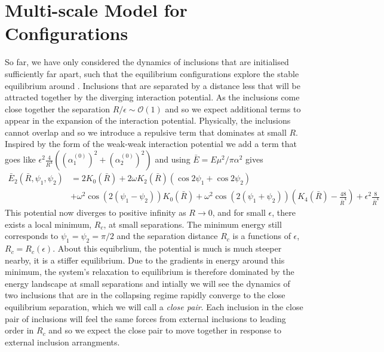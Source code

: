 \section{Multi-scale Model for Configurations}
So far, we have only considered the dynamics of inclusions that are initialised sufficiently far apart, such that the equilibrium configurations explore the stable equilibrium around . Inclusions that are separated by a distance less that  will be attracted together by the diverging interaction potential. As the inclusions come close together the separation $R/\epsilon\sim\mathcal{O}(1)$ and so we expect additional terms to appear in the expansion of the interaction potential. Physically, the inclusions cannot overlap and so we introduce a repulsive term that dominates at small $R$. Inspired by the form of the weak-weak interaction potential we add a term  that goes like $\epsilon^2\frac{4}{R^4}((\alpha_{1}^{(0)})^2+(\alpha_{2}^{(0)})^2)$ and using $\bar{E}=E\mu^2/\pi\alpha^2$ gives
\begin{equation}
\begin{split}
    \bar{E}_2(\bar{R}, \psi_1, \psi_2) &= 2K_0(\bar{R}) + 2\omega K_2(\bar{R})(\cos2\psi_1+\cos2\psi_2) \\
    &+\omega^2\cos(2(\psi_1-\psi_2))K_0(\bar{R})+\omega^2\cos(2(\psi_1+\psi_2))\left(K_4(\bar{R})-\frac{48}{\bar{R}^4}\right) + \epsilon^2\frac{8}{\bar{R}^4}
\end{split}
\end{equation}
This potential now diverges to positive infinity as $R \rightarrow 0$, and for small $\epsilon$, there exists a local minimum, $R_c$, at small separations. The minimum energy still corresponds to $\psi_1 = \psi_2 = \pi/2$ and the separation distance $R_c$ is a functions of $\epsilon$, $R_c=R_c(\epsilon)$. About this equibrlium, the potential is much is much steeper nearby, it is a stiffer equilibrium. Due to the gradients in energy around this minimum, the system's relaxation to equilibrium is therefore dominated by the energy landscape at small separations and intially we will see the dynamics of two inclusions that are in the collapsing regime rapidly converge to the close equilibrium separation, which we will call a \textit{close pair}. Each inclusion in the close pair of inclusions will feel the same forces from external inclusions to leading order in $R_c$ and so we expect the close pair to move together in response to external inclusion arrangments.

